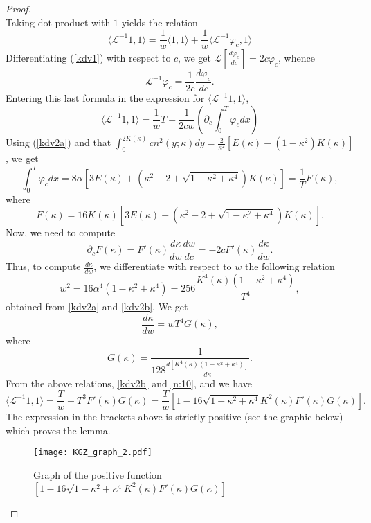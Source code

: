 \documentclass[final,11pt,leqno]{amsart}
\begin{document}
\begin{proof}
\begin{equation}
  \end{equation}
  Taking dot product with $1$ yields the relation
    $$\langle \mathcal{L}^{-1}1,1\rangle = {\frac{1}{w}}\langle
    1,1\rangle + {\frac{1}{w}}\langle \mathcal{L}^{-1}\varphi_c,
    1\rangle$$
    Differentiating (\ref{kdv1}) with respect to $c$, we get $\mathcal{L}[\frac{d\varphi_c}{dc}]=2c\varphi_c$, whence
    \begin{equation}\label{kdv5}
         \mathcal{L}^{-1}\varphi_c={\frac{1}{2c}}{\frac{d\varphi_c}{dc}}.
     \end{equation}
 Entering this last formula in the expression
  for $\langle \mathcal{L}^{-1}1,1\rangle$,
   \begin{equation}\label{kdv7}
   \langle \mathcal{L}^{-1}1,1\rangle
   ={\frac{1}{w}}T+{\frac{1}{2cw}}\left({\partial}_c \int_{0}^{T}{\varphi_c}dx\right)
   \end{equation}
   Using (\ref{kdv2a}) and that $\int_{0}^{2K(\kappa)}{cn^2(y;
   \kappa)}dy={\frac{2}{\kappa^2}}[E(\kappa)-(1-\kappa^2)K(\kappa)]$,
   we get
     \begin{equation}\label{kdv7b}
     \int_{0}^{T}{\varphi_c}dx=8\alpha[3E(\kappa)+(\kappa^2-2+\sqrt{1-\kappa^2+\kappa^4})K(\kappa)]={\frac{1}{T}}F(\kappa),
     \end{equation}
     where
     $$
     F(\kappa)=16K(\kappa)[3E(\kappa)+(\kappa^2-2+\sqrt{1-\kappa^2+\kappa^4})K(\kappa)].
     $$
   Now, we need to compute
   $$
   {\partial}_c F({\kappa})=F'({\kappa}) \frac{d\kappa}{dw}
   \frac{d w}{d c}=-2c F'({\kappa}) \frac{d\kappa}{dw}.
   $$
    Thus, to compute $\frac{d\kappa}{dw}$, we differentiate with respect to $w$ the following relation
    \begin{equation}
    \label{n:10}
    w^2=16 \alpha^4(1-\kappa^2+\kappa^4)=
     256 {\frac{{K^4({\kappa})(1-\kappa^2+\kappa^4)}}{{T^4}}},
     \end{equation}
  obtained from \eqref{kdv2a} and \eqref{kdv2b}.  We get
       \begin{equation}\label{kdv7a}
       {\frac{d\kappa}{dw}}=wT^4G(\kappa),
       \end{equation}
       where
       $$G(\kappa)={\frac{1}{128{\frac{d[K^4(\kappa)(1-\kappa^2+\kappa^4)]}{d\kappa}}}}.$$
    From the above relations, \eqref{kdv2b} and \eqref{n:10},  and  we have
      \begin{equation}
      \label{kdv8}
         \langle
         \mathcal{L}^{-1}1,1\rangle={\frac{T}{w}}-T^3F'(\kappa)G(\kappa)={\frac{T}{w}}[1-16\sqrt{1-\kappa^2+\kappa^4}K^2(\kappa)F'(\kappa)G(\kappa)].
       \end{equation}
       The expression in the   brackets  above is strictly positive (see the graphic below)
   which proves the lemma.
   \begin{figure}[h7]
\centering
\texttt{[image: KGZ\_graph\_2.pdf]}
\caption{Graph of the positive function $[1-16\sqrt{1-\kappa^2+\kappa^4}K^2(\kappa)F'(\kappa)G(\kappa)]$}
\label{fig7}
\end{figure}
\end{proof}
\end{document}
